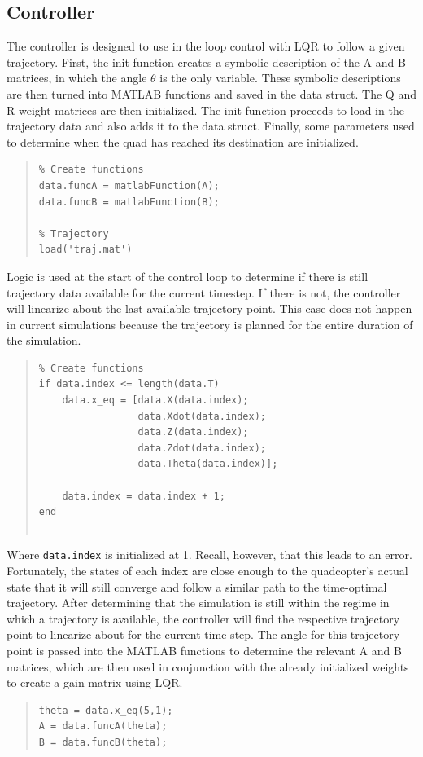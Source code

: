 \documentclass[12pt]{article}
\begin{document}
\subsection{Controller}
The controller is designed to use in the loop control with LQR to follow a given trajectory. First, the init function creates a symbolic description of the A and B matrices, in which the angle $\theta$ is the only variable.  These symbolic descriptions are then turned into MATLAB functions and saved in the data struct.  The Q and R weight matrices are then initialized.  The init function proceeds to load in the trajectory data and also adds it to the data struct.  Finally, some parameters used to determine when the quad has reached its destination are initialized.
\begin{quote}
\begin{lstlisting}
% Create functions
data.funcA = matlabFunction(A);
data.funcB = matlabFunction(B);

% Trajectory
load('traj.mat')
\end{lstlisting}
\end{quote}

Logic is used at the start of the control loop to determine if there is still trajectory data available for the current timestep.  If there is not, the controller will linearize about the last available trajectory point.  This case does not happen in current simulations because the trajectory is planned for the entire duration of the simulation.
\begin{quote}
\begin{lstlisting}
% Create functions
if data.index <= length(data.T)
    data.x_eq = [data.X(data.index);
                 data.Xdot(data.index);
                 data.Z(data.index);
                 data.Zdot(data.index);
                 data.Theta(data.index)];
             
    data.index = data.index + 1;
end


\end{lstlisting}
\end{quote}
Where \lstinline!data.index! is initialized at 1. Recall, however, that this leads to an error. Fortunately, the states of each index are close enough to the quadcopter's actual state that it will still converge and follow a similar path to the time-optimal trajectory. 
\newline
\newline
After determining that the simulation is still within the regime in which a trajectory is available, the controller will find the respective trajectory point to linearize about for the current time-step.  The angle for this trajectory point is passed into the MATLAB functions to determine the relevant A and B matrices, which are then used in conjunction with the already initialized weights to create a gain matrix using LQR.
\begin{quote}
\begin{lstlisting}
theta = data.x_eq(5,1);
A = data.funcA(theta);
B = data.funcB(theta);

\end{lstlisting}
\end{quote}
\end{document}

